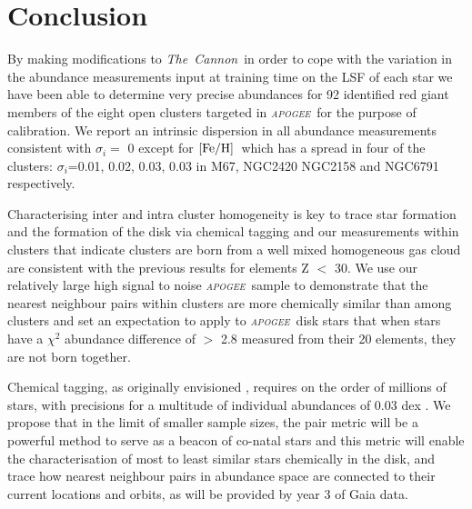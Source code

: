 \documentclass[14pt, preprint2]{aastex6}
\newcommand{\project}[1]{\textsl{#1}}
\newcommand{\tc}{\project{The~Cannon}}
\newcommand{\apogee}{\project{\textsc{apogee}}}
\newcommand{\feh}{\mbox{$\rm [Fe/H]$}}
\begin{document}
\section{Conclusion}


By making modifications to \tc\ in order to cope with the variation in the abundance measurements input at training time on the LSF of each star we have been able to determine very precise abundances for 92 identified red giant members of the eight open clusters targeted in \apogee\ for the purpose of calibration. We report an intrinsic dispersion in all abundance measurements consistent with $\sigma_i=$ 0 except for \feh\ which has a spread in four of the clusters: $\sigma_i$=0.01, 0.02,  0.03, 0.03 in M67, NGC2420 NGC2158 and NGC6791 respectively. 

Characterising inter and intra cluster homogeneity is key to trace star formation and the formation of the disk via chemical tagging and our measurements within clusters that indicate clusters are born from a well mixed homogeneous gas cloud are consistent with the previous results for elements Z $<$ 30. We use our relatively large high signal to noise \apogee\ sample to demonstrate that the nearest neighbour pairs within clusters are more chemically similar than among clusters and set an expectation to apply to \apogee\ disk stars that when stars have a $\chi^2$ abundance difference of $>$ 2.8 measured from their 20 elements, they are not born together. 

Chemical tagging, as originally envisioned \citep{freeman2002}, requires on the 
order of millions of stars, with precisions for a multitude of individual 
abundances of 0.03 dex \citep{Ting2015}. We propose that in the limit of smaller sample sizes, the pair metric will be a powerful method to serve as a beacon of co-natal stars and this metric will enable the characterisation of most to least similar stars chemically in the disk, and trace how nearest neighbour pairs in abundance space are connected to their current locations and orbits, as will be provided by year 3 of Gaia data. 


\end{document}
